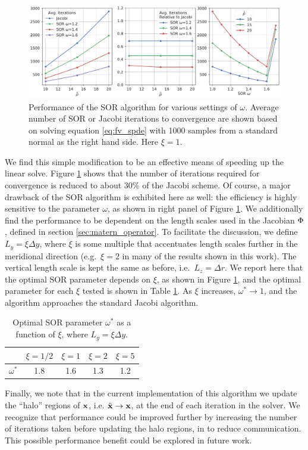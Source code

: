 \begin{figure}
    \includegraphics[width=\textwidth]{../figures/sor_noXi.pdf}
    \caption{Performance of the SOR algorithm for various settings of $\omega$.
        Average number of SOR or Jacobi iterations to convergence are shown
        based on solving equation \eqref{eq:fv_spde} with 1000 samples from a
        standard normal as the right hand side. Here $\xi=1$.}
    \label{fig:sor}
\end{figure}

We find this simple modification to be an effective means of speeding up the
linear solve.
Figure \ref{fig:sor} shows that the number of iterations required for
convergence is reduced to about 30\% of the Jacobi scheme.
Of course, a major drawback of the SOR algorithm is exhibited here as well: the
efficiency is highly sensitive to the parameter $\omega$, as shown in
right panel of Figure \ref{fig:sor}.
We
additionally find the performance to be dependent on the length scales used in the Jacobian
$\Phi$, defined in section \ref{sec:matern_operator}.
To facilitate the discussion, we define $L_y = \xi \Delta y$, where $\xi$ is
some multiple that accentuates length scales further in the meridional direction
(e.g.\ $\xi=2$ in many of the results shown in this work).
The vertical length scale is kept the same as before, i.e.\ $L_z = \Delta r$.
We report here that the optimal SOR parameter depends on $\xi$, as shown in
Figure \ref{fig:sor}, and
the optimal parameter for each $\xi$ tested is shown in
Table \ref{table:sor_xi}.
As $\xi$ increases, $\omega^*\rightarrow 1$, and the algorithm approaches
the standard Jacobi algorithm.

\begin{table}[]
    \centering
    \caption{Optimal SOR parameter $\omega^*$ as a function of
        $\xi$, where $L_y = \xi \Delta y$.}
    \label{table:sor_xi}
    \begin{tabular}{c|c|c|c|c}
                   & $\xi=1/2$ & $\xi=1$ & $\xi=2$ & $\xi=5$ \\ \hline
        $\omega^*$ & 1.8 & 1.6 & 1.3 & 1.2                   \\
\end{tabular}
\end{table}

Finally, we note that in the current implementation of this algorithm we update
the ``halo'' regions of $\mathbf{x}$, i.e. $\tilde{\mathbf{x}}\rightarrow\mathbf{x}$, at the end of each iteration in the
solver.
We recognize that performance could be improved further by
increasing the number of iterations taken before updating the halo regions,
in to reduce communication.
This possible performance benefit could be explored in future work.
